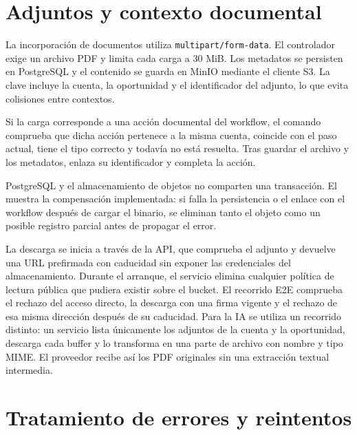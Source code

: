 \section{Adjuntos y contexto documental}

La incorporación de documentos utiliza \texttt{multipart/form-data}. El
controlador exige un archivo PDF y limita cada carga a 30 MiB. Los metadatos se
persisten en PostgreSQL y el contenido se guarda en MinIO mediante el cliente
S3. La clave incluye la cuenta, la oportunidad y el identificador del adjunto,
lo que evita colisiones entre contextos.

Si la carga corresponde a una acción documental del workflow, el comando
comprueba que dicha acción pertenece a la misma cuenta, coincide con el paso
actual, tiene el tipo correcto y todavía no está resuelta. Tras guardar el
archivo y los metadatos, enlaza su identificador y completa la acción.

PostgreSQL y el almacenamiento de objetos no comparten una transacción. El
 muestra la compensación implementada: si
falla la persistencia o el enlace con el workflow después de cargar el binario,
se eliminan tanto el objeto como un posible registro parcial antes de propagar
el error.



La descarga se inicia a través de la API, que comprueba el adjunto y devuelve
una URL prefirmada con caducidad sin exponer las credenciales del
almacenamiento. Durante el arranque, el servicio elimina cualquier política de
lectura pública que pudiera existir sobre el bucket. El recorrido E2E comprueba
el rechazo del acceso directo, la descarga con una firma vigente y el rechazo
de esa misma dirección después de su caducidad. Para la IA se utiliza un
recorrido distinto: un servicio lista únicamente los adjuntos de la cuenta y
la oportunidad, descarga cada buffer y lo transforma en una parte de archivo
con nombre y tipo MIME. El proveedor recibe así los PDF originales sin una
extracción textual intermedia.

\section{Tratamiento de errores y reintentos}

